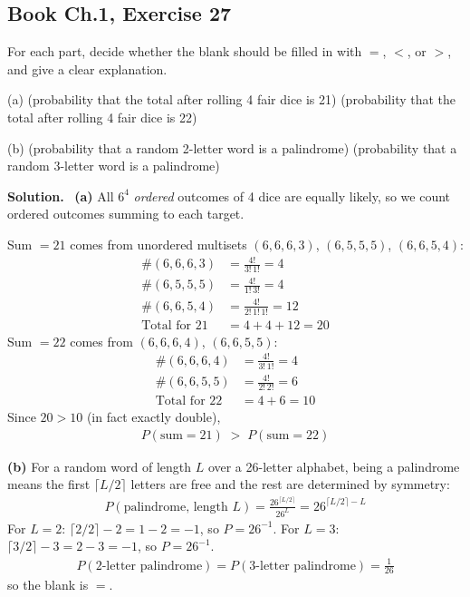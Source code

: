 \documentclass[11pt]{article}
\newcommand{\Sol}{\vspace{2pt}\noindent\textbf{Solution.}\ }
\begin{document}
\subsection{Book Ch.1, Exercise 27}
\begin{qbox}
For each part, decide whether the blank should be filled in with $=$, $<$, or $>$, and give a clear explanation.

(a) (probability that the total after rolling 4 fair dice is 21) \underline{\hspace{1cm}} (probability that the total after rolling 4 fair dice is 22)

(b) (probability that a random 2-letter word is a palindrome) \underline{\hspace{1cm}} (probability that a random 3-letter word is a palindrome)
\end{qbox}
\Sol
\textbf{(a)} All $6^4$ \emph{ordered} outcomes of 4 dice are equally likely, so we count ordered outcomes summing to each target.

Sum $=21$ comes from unordered multisets $(6,6,6,3)$, $(6,5,5,5)$, $(6,6,5,4)$:
\begin{align*}
\#(6,6,6,3) &= \frac{4!}{3!\,1!} = 4\\
\#(6,5,5,5) &= \frac{4!}{1!\,3!} = 4\\
\#(6,6,5,4) &= \frac{4!}{2!\,1!\,1!} = 12\\
\text{Total for }21 &= 4+4+12 = 20
\end{align*}
Sum $=22$ comes from $(6,6,6,4)$, $(6,6,5,5)$:
\begin{align*}
\#(6,6,6,4) &= \frac{4!}{3!\,1!} = 4\\
\#(6,6,5,5) &= \frac{4!}{2!\,2!} = 6\\
\text{Total for }22 &= 4+6 = 10
\end{align*}
Since $20>10$ (in fact exactly double),
\begin{align*}
P(\text{sum}=21) \;>\; P(\text{sum}=22)
\end{align*}

\textbf{(b)} For a random word of length $L$ over a 26-letter alphabet, being a palindrome means the first $\lceil L/2\rceil$ letters are free and the rest are determined by symmetry:
\begin{align*}
P(\text{palindrome, length }L) = \frac{26^{\lceil L/2\rceil}}{26^{L}} = 26^{\lceil L/2\rceil - L}
\end{align*}
For $L=2$: $\lceil 2/2\rceil - 2 = 1-2=-1$, so $P=26^{-1}$.
For $L=3$: $\lceil 3/2\rceil - 3 = 2-3=-1$, so $P=26^{-1}$.
\begin{align*}
P(\text{2-letter palindrome}) = P(\text{3-letter palindrome}) = \frac{1}{26}
\end{align*}
so the blank is $=$.
\end{document}
